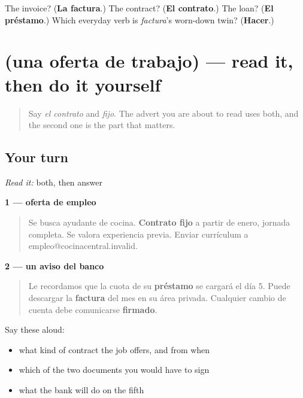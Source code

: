\begin{tcolorbox}[breakable,colback=teal!4,colframe=teal!35!black,title={Before you move on}]
The invoice? (\textbf{La factura}.) The contract? (\textbf{El contrato}.) The loan? (\textbf{El préstamo}.) Which everyday verb is \emph{factura}'s worn-down twin? (\textbf{Hacer}.)
\end{tcolorbox}
\section[Practice]{(una oferta de trabajo) — read it, then do it yourself}

\label{lesson:ES-C441-sintesis-trato}



\begin{quote}
Say \emph{el contrato} and \emph{fijo}. The advert you are about to read uses both, and the second one is the part that matters.
\end{quote}

\subsection*{Your turn}
\emph{Read it:} both, then answer

\textbf{1 — oferta de empleo}

\begin{quote}
Se busca ayudante de cocina. \textbf{Contrato fijo} a partir de enero, jornada completa. Se valora experiencia previa. Enviar currículum a empleo@cocinacentral.invalid.
\end{quote}

\textbf{2 — un aviso del banco}

\begin{quote}
Le recordamos que la cuota de su \textbf{préstamo} se cargará el día 5. Puede descargar la \textbf{factura} del mes en su área privada. Cualquier cambio de cuenta debe comunicarse \textbf{firmado}.
\end{quote}

Say these aloud:

\begin{itemize}
\raggedright
  \item what kind of contract the job offers, and from when
  \item which of the two documents you would have to sign
  \item what the bank will do on the fifth
\end{itemize}

